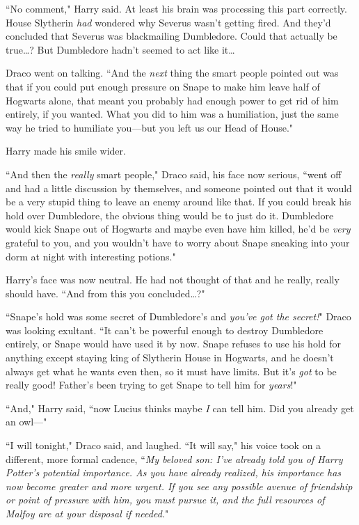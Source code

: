 ``No comment," Harry said. At least his brain was processing this part correctly. House Slytherin \emph{had} wondered why Severus wasn't getting fired. And they'd concluded that Severus was blackmailing Dumbledore. Could that actually be true{\ldots}? But Dumbledore hadn't seemed to act like it{\ldots}

Draco went on talking. ``And the \emph{next} thing the smart people pointed out was that if you could put enough pressure on Snape to make him leave half of Hogwarts alone, that meant you probably had enough power to get rid of him entirely, if you wanted. What you did to him was a humiliation, just the same way he tried to humiliate you—but you left us our Head of House."

Harry made his smile wider.

``And then the \emph{really} smart people," Draco said, his face now serious, ``went off and had a little discussion by themselves, and someone pointed out that it would be a very stupid thing to leave an enemy around like that. If you could break his hold over Dumbledore, the obvious thing would be to just do it. Dumbledore would kick Snape out of Hogwarts and maybe even have him killed, he'd be \emph{very} grateful to you, and you wouldn't have to worry about Snape sneaking into your dorm at night with interesting potions."

Harry's face was now neutral. He had not thought of that and he really, really should have. ``And from this you concluded{\ldots}?"

``Snape's hold was some secret of Dumbledore's and \emph{you've got the secret!}" Draco was looking exultant. ``It can't be powerful enough to destroy Dumbledore entirely, or Snape would have used it by now. Snape refuses to use his hold for anything except staying king of Slytherin House in Hogwarts, and he doesn't always get what he wants even then, so it must have limits. But it's \emph{got} to be really good! Father's been trying to get Snape to tell him for \emph{years}!"

``And," Harry said, ``now Lucius thinks maybe \emph{I} can tell him. Did you already get an owl—"

``I will tonight," Draco said, and laughed. ``It will say," his voice took on a different, more formal cadence, ``\emph{My beloved son: I've already told you of Harry Potter's potential importance. As you have already realized, his importance has now become greater and more urgent. If you see any possible avenue of friendship or point of pressure with him, you must pursue it, and the full resources of Malfoy are at your disposal if needed.}"

